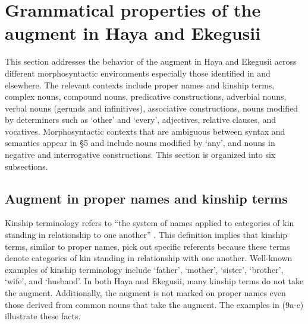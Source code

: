 \documentclass[output=paper]{langscibook}
\begin{document}
\section{Grammatical properties of the augment in Haya and Ekegusii}
	This section addresses the behavior of the augment in Haya and Ekegusii across different morphosyntactic environments especially those identified in \cite{blois1970augment} and elsewhere. The relevant contexts include proper names and kinship terms, complex nouns, compound nouns, predicative constructions, adverbial nouns, verbal nouns (gerunds and infinitives), associative constructions, nouns modified by determiners such as ‘other’ and ‘every’, adjectives, relative clauses, and vocatives. Morphosyntactic contexts that are ambiguous between syntax and semantics appear in §5 and include nouns modified by ‘any’, and nouns in negative and interrogative constructions. This section is organized into six subsections.

\subsection{Augment in proper names and kinship terms} 
Kinship terminology refers to “the system of names applied to categories of kin standing in relationship to one another” \citep{britannica2017}. This definition implies that kinship terms, similar to proper names, pick out specific referents because these terms denote categories of kin standing in relationship with one another. Well-known examples of kinship terminology include ‘father’, ‘mother’, ‘sister’, ‘brother’, ‘wife’, and ‘husband’. In both Haya and Ekegusii, many kinship terms do not take the augment. Additionally, the augment is not marked on proper names even those derived from common nouns that take the augment. The examples in (9a-c) illustrate these facts.
\end{document}
